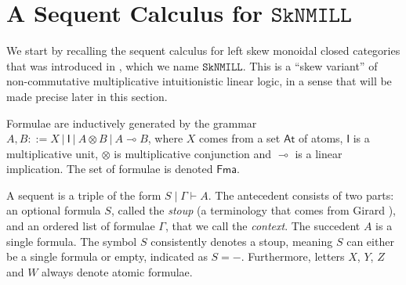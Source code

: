 \documentclass[sn-mathphys-num]{sn-jnl}%
\newcommand{\GG}{\Gamma}
\newcommand{\vd}{\vdash}
\newcommand{\ot}{\otimes}
\newcommand{\lolli}{\multimap}
\newcommand{\unit}{\mathsf{I}}
\newcommand{\SkNMILL}{$\mathtt{SkNMILL}$}
\newcommand{\mf}[1]{\mathsf{#1}}
\theoremstyle{thmstyleone}%
\theoremstyle{thmstyletwo}%
\theoremstyle{thmstylethree}%
\begin{document}
\section{A Sequent Calculus for \SkNMILL}\label{sec:syntax}
We start by recalling the sequent calculus for left skew monoidal closed categories that was introduced in \cite{UVW:protsn}, which we name \SkNMILL. This is a ``skew variant'' of non-commutative multiplicative intuitionistic linear logic, in a sense that will be made precise later in this section.

Formulae are inductively generated by the grammar $A, B::= X \ | \ \unit \ | \ A \ot B \ | \ A \lolli B$, where $X$ comes from a set $\mathsf{At}$ of atoms, $\unit$ is a multiplicative unit, $\ot$ is multiplicative conjunction and $\lolli$ is a linear implication. The set of formulae is denoted $\mf{Fma}$.

A sequent is a triple of the form $S \mid \GG \vd A$. The antecedent consists of two parts: an optional formula $S$, called the \emph{stoup} (a terminology that comes from Girard \cite{girard:constructive:91}), and an ordered list of formulae $\GG$, that we call the \emph{context}. The succedent $A$ is a single formula.
The symbol $S$ consistently denotes a stoup, meaning $S$ can either be a single formula or empty, indicated as $S = {-}$. Furthermore, letters $X$, $Y$, $Z$ and $W$ always denote atomic formulae.
\end{document}
